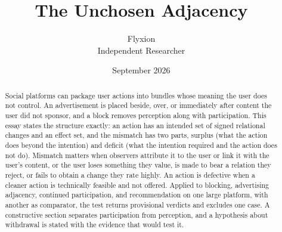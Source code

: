 \documentclass[11pt]{article}
\title{The Unchosen Adjacency}
\author{Flyxion\\Independent Researcher}
\date{September 2026}
\theoremstyle{definition}
\theoremstyle{remark}
\begin{document}
\maketitle

\begin{abstract}
Social platforms can package user actions into bundles whose meaning the user does not control. An advertisement is placed beside, over, or immediately after content the user did not sponsor, and a block removes perception along with participation. This essay states the structure exactly: an action has an intended set of signed relational changes and an effect set, and the mismatch has two parts, surplus (what the action does beyond the intention) and deficit (what the intention required and the action does not do). Mismatch matters when observers attribute it to the user or link it with the user's content, or the user loses something they value, is made to bear a relation they reject, or fails to obtain a change they rate highly. An action is defective when a cleaner action is technically feasible and not offered. Applied to blocking, advertising adjacency, continued participation, and recommendation on one large platform, with another as comparator, the test returns provisional verdicts and excludes one case. A constructive section separates participation from perception, and a hypothesis about withdrawal is stated with the evidence that would test it.
\end{abstract}







\end{document}
